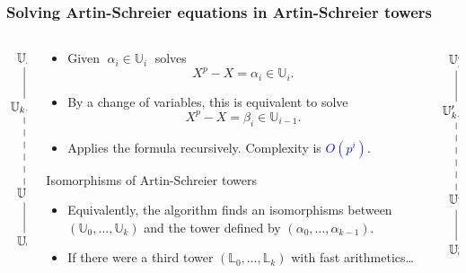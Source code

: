 \documentclass[10pt]{beamer}
\newcommand{\blue}[1]{\textcolor{blue}{#1}}  %
\newcommand{\LK}{\mathbb{L}}  %
\newcommand{\U}{\mathbb{U}}  %
\newcommand{\0}{\mathcal{O}}  %
\begin{document}
\begin{frame}
  \frametitle{Solving Artin-Schreier equations in Artin-Schreier towers}

  \begin{columns}
    \begin{column}{0.1\textwidth}
      \Large\[\xymatrix{
        \U_k\ar@{-}[d]\\
        \U_{k-1} \ar@{--}[dd]\\
        \\
        \U_1 \ar@{-}[d]\\
        \U_0
      }\]
    \end{column}
    \begin{column}{0.75\textwidth}
      \begin{block}{\cite{Couveignes00}}
        \begin{itemize}
        \item Given $\;\alpha_i\in\U_i\;$ solves
          \[X^p-X=\alpha_i\in\U_i\text{.}\]
        \item By a change of variables, this is equivalent to solve
          \[X^p-X=\beta_i\in\U_{i-1}\text{.}\]
        \item Applies the formula recursively. Complexity is
          \blue{$O(p^i)$}.
        \end{itemize}
      \end{block}

      \begin{block}{Isomorphisms of Artin-Schreier towers}
        \begin{itemize}
        \item Equivalently, the algorithm finds an isomorphisms
          between $(\U_0,\ldots,\U_k)$ and the tower defined by
          $(\alpha_0,\ldots,\alpha_{k-1})$.
        \item If there were a third tower $(\LK_0,\ldots,\LK_k)$ with
          fast arithmetics\dots
        \end{itemize}
      \end{block}
    \end{column}
    \begin{column}{0.1\textwidth}
      \Large\[\xymatrix{
        \U_k'\ar@{-}[d]\\
        \U_{k-1}' \ar@{--}[dd]\\
        \\
        \U_1' \ar@{-}[d]\\
        \U_0'
      }\]
    \end{column}
  \end{columns}
\end{frame}
\end{document}
